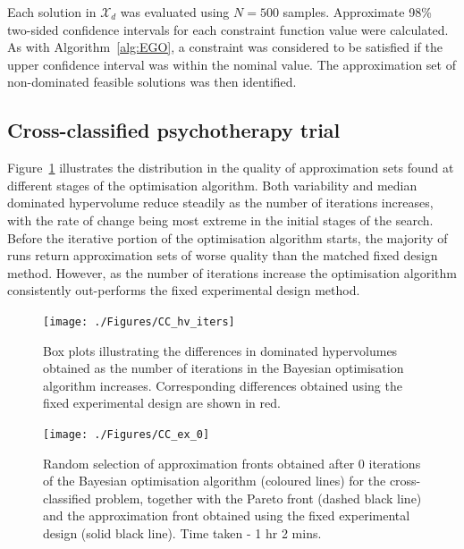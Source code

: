 \documentclass{article} %
\begin{document}
Each solution in $\mathcal{X}_{d}$ was evaluated using $N=500$ samples. Approximate 98\% two-sided confidence intervals for each constraint function value were calculated. As with Algorithm~\ref{alg:EGO}, a constraint was considered to be satisfied if the upper confidence interval was within the nominal value. The approximation set of non-dominated feasible solutions was then identified.

\subsection{Cross-classified psychotherapy trial}

Figure~\ref{fig:CC_hv_iters} illustrates the distribution in the quality of approximation sets found at different stages of the optimisation algorithm. Both variability and median dominated hypervolume reduce steadily as the number of iterations increases, with the rate of change being most extreme in the initial stages of the search. Before the iterative portion of the optimisation algorithm starts, the majority of runs return approximation sets of worse quality than the matched fixed design method. However, as the number of iterations increase the optimisation algorithm consistently out-performs the fixed experimental design method. 

\begin{figure}
\centering
\texttt{[image: ./Figures/CC\_hv\_iters]}
\caption{Box plots illustrating the differences in dominated hypervolumes obtained as the number of iterations in the Bayesian optimisation algorithm increases. Corresponding differences obtained using the fixed experimental design are shown in red.}
\label{fig:CC_hv_iters}
\end{figure}

\begin{figure}
\centering
\texttt{[image: ./Figures/CC\_ex\_0]}
\caption{Random selection of approximation fronts obtained after 0 iterations of the Bayesian optimisation algorithm (coloured lines) for the cross-classified problem, together with the Pareto front (dashed black line) and the approximation front obtained using the fixed experimental design (solid black line). Time taken - 1 hr 2 mins.}
\label{fig:CC_ex_0}
\end{figure}
\end{document}
